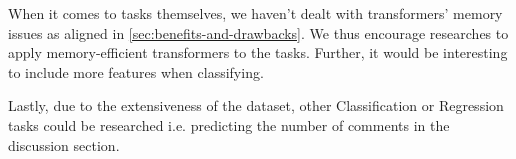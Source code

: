 When it comes to tasks themselves, we haven't dealt with transformers' memory issues as 
aligned in \autoref{sec:benefits-and-drawbacks}. We thus encourage researches
to apply memory-efficient transformers to the tasks. Further, it would be 
interesting to include more features when classifying.

Lastly, due to the extensiveness of the dataset, other Classification or Regression tasks
could be researched i.e. predicting the number of comments in the discussion section.






